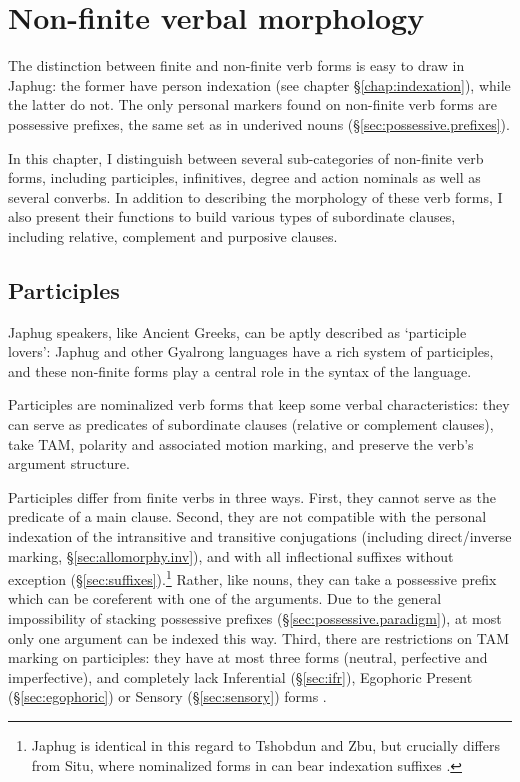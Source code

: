 \chapter{Non-finite verbal morphology} \label{chap:non-finite}
The distinction between finite and non-finite verb forms is easy to draw in Japhug: the former have person indexation (see chapter §\ref{chap:indexation}), while the latter do not. The only personal markers found on non-finite verb forms are possessive prefixes, the same set as in underived nouns (§\ref{sec:possessive.prefixes}).

In this chapter, I distinguish between several sub-categories of non-finite verb forms, including participles, infinitives, degree and action nominals as well as several converbs. In addition to describing the morphology of these verb forms, I also present their functions to build various types of subordinate clauses, including relative, complement and purposive clauses.

\section{Participles} \label{sec:participles}
Japhug speakers, like Ancient Greeks, can be aptly described as  `participle lovers': Japhug and other Gyalrong languages have a rich system of participles, and these non-finite forms play a central role in the syntax of the language.

Participles are nominalized verb forms that keep some verbal characteristics: they can serve as predicates of subordinate clauses (relative or complement clauses), take TAM, polarity and associated motion marking, and preserve the verb's argument structure.

Participles differ from finite verbs in three ways. First, they cannot serve as the predicate of a main clause. Second, they are not compatible with the personal indexation of the intransitive and transitive conjugations (including direct/inverse marking, §\ref{sec:allomorphy.inv}), and with all inflectional suffixes without exception (§\ref{sec:suffixes}).\footnote{Japhug is identical in this regard to Tshobdun and Zbu, but crucially differs from Situ, where nominalized forms in  can bear indexation suffixes \citep{jackson06guanxiju,jacksonlin07}. } Rather, like nouns, they can take a possessive prefix which can be coreferent with one of the arguments. Due to the general impossibility of stacking possessive prefixes (§\ref{sec:possessive.paradigm}), at most only one argument can be indexed this way. Third, there are restrictions on TAM marking on participles: they have at most three forms (neutral, perfective and imperfective), and completely lack Inferential (§\ref{sec:ifr}), Egophoric Present (§\ref{sec:egophoric}) or Sensory (§\ref{sec:sensory}) forms .

